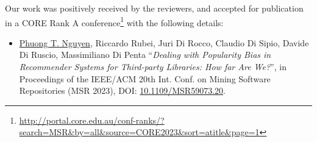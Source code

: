 Our work was positively received by the reviewers, and %
accepted for publication in a CORE Rank A conference\footnote{\url{http://portal.core.edu.au/conf-ranks/?search=MSR&by=all&source=CORE2023&sort=atitle&page=1}} with the following details: %
\begin{itemize}
	\item \small{\underline{Phuong T. Nguyen}, Riccardo Rubei, Juri Di Rocco, Claudio Di Sipio, Davide Di Ruscio, Massimiliano Di Penta ``\emph{Dealing with Popularity Bias in Recommender Systems for Third-party Libraries: How far Are We?}'', in Proceedings of the IEEE/ACM 20th Int. Conf. on Mining Software Repositories (MSR 2023), %
		DOI: \href{https://doi.org/10.1109/MSR59073.2023.00016}{10.1109/MSR59073.20}.}
\end{itemize}






